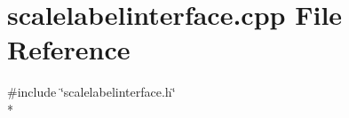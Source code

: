\section{scalelabelinterface.\+cpp File Reference}
\label{bk3_2scalelabelinterface_8cpp}
{\ttfamily \#include \char`\"{}scalelabelinterface.\+h\char`\"{}}\\*
